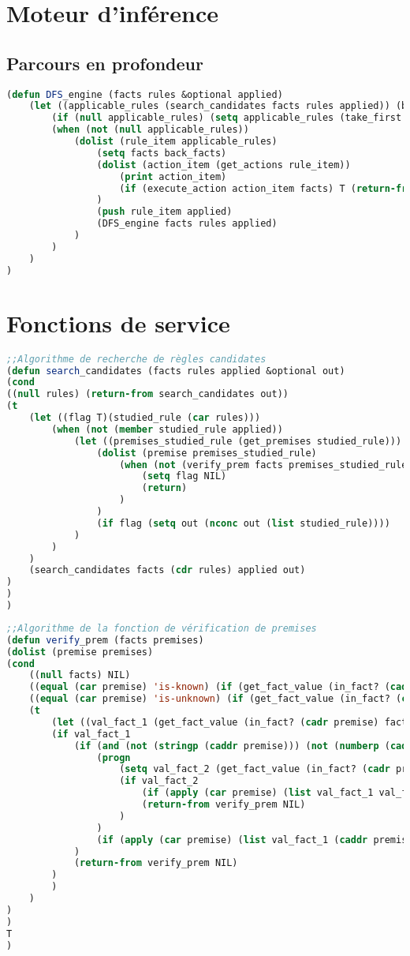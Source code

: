 \documentclass[a4paper, 10pt, leqno]{report}
\theoremstyle{plain}
\begin{document}
\section{Moteur d'inférence}

\subsection{Parcours en profondeur}

\begin{lstlisting}[language=lisp]
(defun DFS_engine (facts rules &optional applied)
	(let ((applicable_rules (search_candidates facts rules applied)) (back_facts facts))
		(if (null applicable_rules) (setq applicable_rules (take_first *rules* applied)))
		(when (not (null applicable_rules))
			(dolist (rule_item applicable_rules)
				(setq facts back_facts)
				(dolist (action_item (get_actions rule_item))
					(print action_item)
					(if (execute_action action_item facts) T (return-from DFS_engine *solutions*))
				)
				(push rule_item applied)
				(DFS_engine facts rules applied)
			)
		)
	)
)
\end{lstlisting}

\section{Fonctions de service}

\begin{lstlisting}[language=lisp]
;;Algorithme de recherche de règles candidates
(defun search_candidates (facts rules applied &optional out)
(cond
((null rules) (return-from search_candidates out))
(t
	(let ((flag T)(studied_rule (car rules)))
		(when (not (member studied_rule applied))
			(let ((premises_studied_rule (get_premises studied_rule)))
				(dolist (premise premises_studied_rule)
					(when (not (verify_prem facts premises_studied_rule))
						(setq flag NIL)
						(return)
					)
				)
				(if flag (setq out (nconc out (list studied_rule))))
			)
		)
	)
	(search_candidates facts (cdr rules) applied out)
)
)
)
\end{lstlisting}

\begin{lstlisting}[language=lisp]
;;Algorithme de la fonction de vérification de premises
(defun verify_prem (facts premises)
(dolist (premise premises)
(cond 
	((null facts) NIL)
	((equal (car premise) 'is-known) (if (get_fact_value (in_fact? (cadr premise) facts) facts) T (return-from verify_prem NIL)))
	((equal (car premise) 'is-unknown) (if (get_fact_value (in_fact? (cadr premise) facts) facts) (return-from verify_prem NIL) T))
	(t  
		(let ((val_fact_1 (get_fact_value (in_fact? (cadr premise) facts) facts)) (val_fact_2))
		(if val_fact_1 
			(if (and (not (stringp (caddr premise))) (not (numberp (caddr premise)))) 
				(progn
					(setq val_fact_2 (get_fact_value (in_fact? (cadr premise) facts) facts))
					(if val_fact_2
						(if (apply (car premise) (list val_fact_1 val_fact_2)) T (return-from verify_prem NIL))
						(return-from verify_prem NIL)
					)
				)
				(if (apply (car premise) (list val_fact_1 (caddr premise))) T (return-from verify_prem NIL))
			)
			(return-from verify_prem NIL)
		)	
		)
	)
)
)
T	
)
\end{lstlisting}
\end{document}
